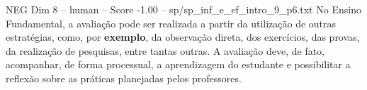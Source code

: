 \begin{textsample}{NEG Dim 8 – human – Score -1.00 – sp/sp\_inf\_e\_ef\_intro\_9\_p6.txt}  \label{ex:f8_neg_016}
No Ensino Fundamental, a avaliação pode ser realizada a partir da utilização de outras estratégias, como, por \textbf{exemplo}, da observação direta, dos exercícios, das provas, da realização de pesquisas, entre tantas outras.
A avaliação deve, de fato, acompanhar, de forma processual, a aprendizagem do estudante e possibilitar a reflexão sobre as práticas planejadas pelos professores.

\end{textsample}
